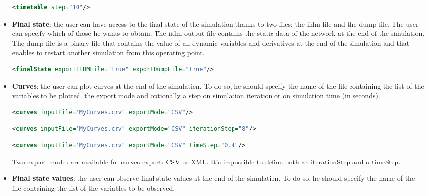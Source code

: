 \documentclass[a4paper, 12pt]{report}
\begin{document}
\begin{itemize}
\begin{lstlisting}[language=XML, morekeywords={timeline},numbers=none]
<timetable step="10"/>
\end{lstlisting}

\item \textbf{Final state}: the user can have access to the final state of the simulation thanks to two files: the iidm file and the dump file. The user can specify which of those he wants to obtain. The iidm output file contains the static data of the network at the end of the simulation. The dump file is a binary file that contains the value of all dynamic variables and derivatives at the end of the simulation and that enables to restart another simulation from this operating point.

\begin{lstlisting}[language=XML, morekeywords={finalState},numbers=none]
<finalState exportIIDMFile="true" exportDumpFile="true"/>
\end{lstlisting}

\item \textbf{Curves}: the user can plot curves at the end of the simulation. To do so, he should specify the name of the file containing the list of the variables to be plotted, the export mode and optionally a step on simulation iteration or on simulation time (in seconds).

\begin{lstlisting}[language=XML, morekeywords={curves},numbers=none]
<curves inputFile="MyCurves.crv" exportMode="CSV"/>
\end{lstlisting}

\begin{lstlisting}[language=XML, morekeywords={curves},numbers=none]
<curves inputFile="MyCurves.crv" exportMode="CSV" iterationStep="8"/>
\end{lstlisting}

\begin{lstlisting}[language=XML, morekeywords={curves},numbers=none]
<curves inputFile="MyCurves.crv" exportMode="CSV" timeStep="0.4"/>
\end{lstlisting}

Two export modes are available for curves export: CSV or XML.
It's impossible to define both an iterationStep and a timeStep.

\item \textbf{Final state values}: the user can observe final state values at the end of the simulation. To do so, he should specify the name of the file containing the list of the variables to be observed.


\end{itemize}
\end{document}
